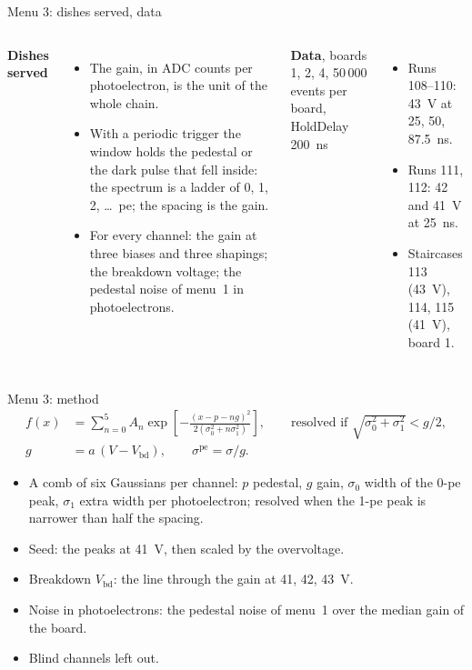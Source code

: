 \documentclass[10pt,aspectratio=169]{beamer}
\begin{document}
\begin{frame}{Menu 3: dishes served, data}
\begin{columns}
\textbf{Dishes served}
\begin{itemize}
\item The gain, in ADC counts per photoelectron, is the unit of the whole chain.
\item With a periodic trigger the window holds the pedestal or the dark pulse that fell
  inside: the spectrum is a ladder of 0, 1, 2, \ldots~pe; the spacing is the gain.
\item For every channel: the gain at three biases and three shapings; the breakdown voltage;
  the pedestal noise of menu~1 in photoelectrons.
\end{itemize}
\textbf{Data}, boards 1, 2, 4, 50\,000 events per board, HoldDelay 200~ns
\begin{itemize}
\item Runs 108--110: 43~V at 25, 50, 87.5~ns.
\item Runs 111, 112: 42 and 41~V at 25~ns.
\item Staircases 113 (43~V), 114, 115 (41~V), board 1.
\end{itemize}
\end{columns}
\end{frame}

\begin{frame}{Menu 3: method}
\begin{align*}
f(x) &= \sum_{n=0}^{5} A_n \exp\left[-\frac{(x - p - n g)^2}{2(\sigma_0^2 + n\sigma_1^2)}\right],
\qquad \text{resolved if } \sqrt{\sigma_0^2 + \sigma_1^2} < g/2, \\
g &= a\,(V - V_\mathrm{bd}), \qquad \sigma^\mathrm{pe} = \sigma / g.
\end{align*}
\begin{itemize}
\item A comb of six Gaussians per channel: $p$ pedestal, $g$ gain, $\sigma_0$ width of the
  0-pe peak, $\sigma_1$ extra width per photoelectron; resolved when the 1-pe peak is narrower
  than half the spacing.
\item Seed: the peaks at 41~V, then scaled by the overvoltage.
\item Breakdown $V_\mathrm{bd}$: the line through the gain at 41, 42, 43~V.
\item Noise in photoelectrons: the pedestal noise of menu~1 over the median gain of the board.
\item Blind channels left out.
\end{itemize}
\end{frame}
\end{document}
